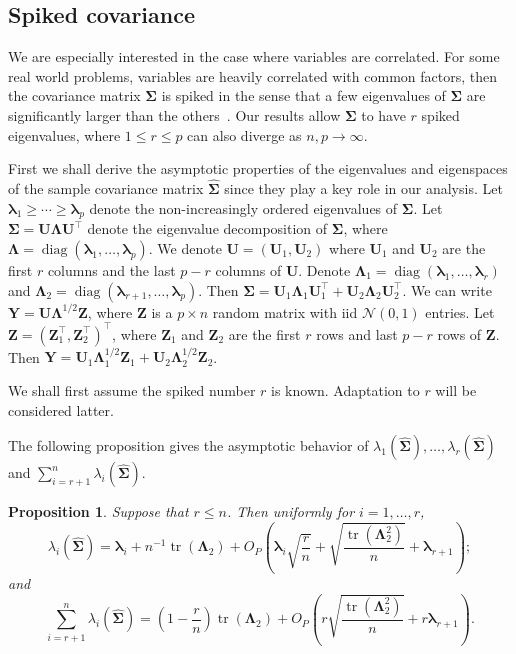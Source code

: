 \documentclass[12pt]{article} %
\DeclareMathOperator{\mytr}{tr}
\DeclareMathOperator{\mydiag}{diag}
\newcommand{\bZ}{\mathbf{Z}}
\newcommand{\bY}{\mathbf{Y}}
\newcommand{\bU}{\mathbf{U}}
\newcommand{\bfsym}[1]{\ensuremath{\boldsymbol{#1}}}
\def\blambda {\bfsym {\lambda}}
\def\bLambda {\bfsym {\Lambda}}
\def\bSigma {\bfsym {\Sigma}}
\newtheorem{proposition}{Proposition}
\theoremstyle{definition}
\begin{document}
\subsection{Spiked covariance}
We are especially interested in the case where variables are correlated.
For some real world problems, variables are heavily correlated with common factors, then the covariance matrix $\bSigma$ is spiked in the sense that a few eigenvalues of $\bSigma$ are significantly larger than the others~\citep{Fan2008High,Cai2012Sparse,Shen2013Consistency,Ma2015A}.
Our results allow $\bSigma$ to have $r$ spiked eigenvalues, where $1\leq r\leq p$ can also diverge as $n,p\to \infty$.


First we shall derive the asymptotic properties of the eigenvalues and eigenspaces of the sample covariance matrix $\hat{\bSigma}$ since they play a key role in our analysis.
Let $\blambda_1\geq\cdots \geq \blambda_p$ denote the non-increasingly ordered eigenvalues of $\bSigma$.
Let $\bSigma= \bU\bLambda \bU^\top$ denote the eigenvalue decomposition of $\bSigma$, where $\bLambda =\mydiag (\blambda_1,\ldots,\blambda_p)$.
We denote $\bU=(\bU_1,\bU_2)$ where $\bU_1$ and $\bU_2$ are the first $r$ columns and the last $p-r$ columns of $\bU$.
Denote $\bLambda_1=\mydiag(\blambda_1,\ldots,\blambda_r)$ and $\bLambda_2=\mydiag(\blambda_{r+1},\ldots,\blambda_p)$.
Then $\bSigma=\bU_1\bLambda_1 \bU_1^\top+\bU_2\bLambda_2 \bU_2^\top$.
We can write $\bY=\bU\bLambda^{1/2}\bZ$, where $\bZ$ is a $p\times n$ random matrix with iid $\mathcal{N}(0,1)$ entries.
    Let $\bZ =(\bZ_1^\top,\bZ_2^\top)^\top$, where $\bZ_1$ and $\bZ_2$ are the first $r$ rows and last $p-r$ rows of $\bZ$.
    Then $\bY=\bU_1 \bLambda_1^{1/2} \bZ_1 +\bU_2 \bLambda_2^{1/2} \bZ_2$.




    We shall first assume the spiked number $r$ is known. Adaptation to $r$ will be considered latter.

    The following proposition gives the asymptotic behavior of $\lambda_1(\hat{\bSigma}),\ldots, \lambda_r(\hat{\bSigma})$ and $\sum_{i=r+1}^n\lambda_i(\hat{\bSigma})$.
\begin{proposition}
    \label{eigenvalueProp}
    Suppose that $r\leq n$.
    Then uniformly for $i=1,\ldots, r$, 
\begin{equation*}
    \lambda_i(\hat{\bSigma})
        =
        \blambda_i
        +
        n^{-1}\mytr(\bLambda_2)
        +O_P\left(\blambda_i \sqrt{\frac{r}{n}}+\sqrt{\frac{\mytr(\bLambda_2^2)}{ n}}+\blambda_{r+1}\right);
    \end{equation*}
        and
\begin{equation*}
     \sum_{i=r+1}^n\lambda_i(\hat{\bSigma})
    =
    \left(1-\frac{r}{n}\right)\mytr(\bLambda_2)
    +O_P\left(r\sqrt{\frac{\mytr(\bLambda_2^2)}{ n}}+r\blambda_{r+1}\right)
    .
\end{equation*}
\end{proposition}
\end{document}
